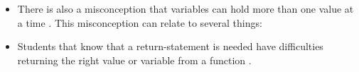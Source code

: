 \documentclass[a4paper,10pt,article,oneside,oldfontcommands]{memoir}
\begin{document}
\begin{itemize}
    \item There is also a misconception that variables can hold more than 
one value at a time \parencite{Doukakis2007}. This misconception can 
relate to several things:

    \item Students that know that a return-statement is needed have 
difficulties returning the right value or variable from a function 
\parencite{KumarVeerasamy2016}. 

\end{itemize}
\end{document}
